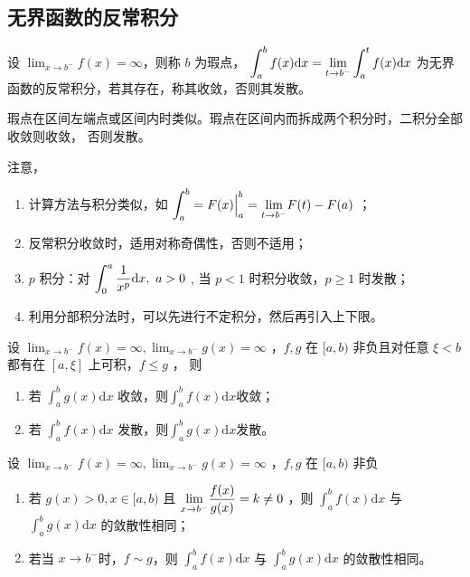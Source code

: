 \subsection{无界函数的反常积分}

设 $ {\displaystyle\lim_{x\rightarrow b^-}}f(x) = \infty $，则称 $ b $ 为瑕点，
$ \displaystyle \int_a^b f(x)\mathrm{d}x = {\displaystyle\lim_{t\rightarrow b^-}}
\int_a^t f(x)\mathrm{d}x $ 为无界函数的反常积分，若其存在，称其收敛，否则其发散。

瑕点在区间左端点或区间内时类似。瑕点在区间内而拆成两个积分时，二积分全部收敛则收敛，
否则发散。

注意，
\begin{enumerate}
    \item 计算方法与积分类似，如 $\displaystyle \int_a^{b} = F(x)\Big|^{b}_a = 
    {\displaystyle\lim_{t\rightarrow b^-}}F(t) - F(a) $ ；
    \item 反常积分收敛时，适用对称奇偶性，否则不适用；
    \item $ p $ 积分：对 $ \displaystyle \int_0^{a}\dfrac{1}{x^p}\mathrm{d}x,\ a>0 $ ,
    当 $ p < 1 $ 时积分收敛，$ p\geq 1 $ 时发散；
    \item 利用分部积分法时，可以先进行不定积分，然后再引入上下限。
\end{enumerate}

\begin{Theo}[比较判别法]

    设 $ {\displaystyle\lim_{x\rightarrow b^-}}f(x) = \infty,{\displaystyle\lim_{x\rightarrow b^-}}
    g(x) = \infty $ ，$ f,g $ 在 $ [a,b) $ 非负且对任意 $ \xi < b $ 都有在 $ [a,\xi] $ 上可积，$ f\leq g $ ，
    则\begin{enumerate}
        \item 若 $ \int_a^{b}g(x)\mathrm{d}x $ 收敛，则$ \int_a^{b}f(x)\mathrm{d}x $收敛；
        \item 若 $ \int_a^{b}f(x)\mathrm{d}x $ 发散，则$ \int_a^{b}g(x)\mathrm{d}x $发散。
    \end{enumerate}
\end{Theo}

\begin{Theo}[比较判别法]

    设 $ {\displaystyle\lim_{x\rightarrow b^-}}f(x) = \infty,{\displaystyle\lim_{x\rightarrow b^-}}
    g(x) = \infty $ ，$ f,g $ 在 $ [a,b) $ 非负
    \begin{enumerate}
        \item 若 $ g(x) > 0, x\in[a,b) $ 且 $ \displaystyle {\displaystyle\lim_{x\rightarrow b^-}}
        \dfrac{f(x)}{g(x)} = k \neq 0 $ ，则 $ \int_a^{b}f(x)\mathrm{d}x $ 与
        $ \int_a^{b}g(x)\mathrm{d}x $ 的敛散性相同；
        \item 若当 $ x\rightarrow b^- $时，$ f\sim g $，则 $ \int_a^{b}f(x)\mathrm{d}x $ 与
        $ \int_a^{b}g(x)\mathrm{d}x $ 的敛散性相同。
    \end{enumerate}
\end{Theo}

